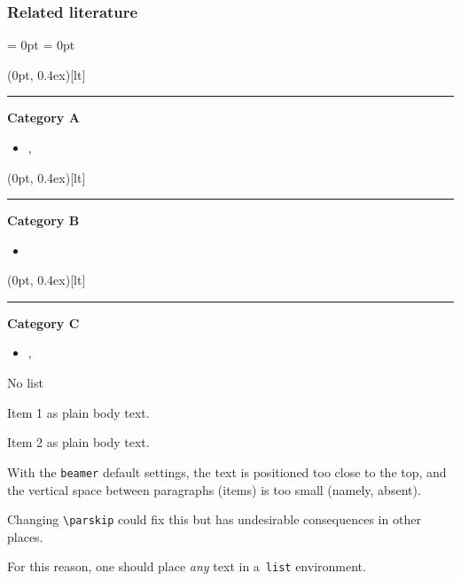 \documentclass[aspectratio = 169, t, 10pt]{beamer}
\let \cite \textcite
\begin{document}
\begin{frame}

\frametitle{%
	\tcbox[
		bottom = 1pt, left = 1pt, right = 1pt, top = 0.5pt,
		boxrule = 0pt, colback = ErasmusZincYellow, colframe = white, coltext = structure,
		on line, sharp corners
	]{\scriptsize\insertsection} \\[\smallskipamount]
	Related literature%
}

\begin{list}{}{\leftmargin = 0pt \itemindent = 0pt}
	\item<+->
		\makebox(0pt, 0.4ex)[lt]{%
			\color{ErasmusZincYellow!50}\rule{}{1.1ex}%
		}%
		\textbf{Category A}
	\par
		\begin{itemize}
			\item \cite{aristotle:anima}, \cite{aristotle:physics}
		\end{itemize}
	\item<+->
		\makebox(0pt, 0.4ex)[lt]{%
			\color{ErasmusZincYellow!50}\rule{}{1.1ex}%
		}%
		\textbf{Category B} \par
		\begin{itemize}
			\item \Cite{vangennep}
		\end{itemize}
	\item<+->
		\makebox(0pt, 0.4ex)[lt]{%
			\color{ErasmusZincYellow!50}\rule{}{1.1ex}%
		}%
		\textbf{Category C} \par
		\begin{itemize}
			\item \cite{gerhardt}, \cite{chiu}
		\end{itemize}
\end{list}

\end{frame}


\begin{frame}{No list}

Item 1 as plain body text.

Item 2 as plain body text.

\alert{With the \texttt{beamer} default settings, the text is positioned too close to the top, and the vertical space between paragraphs (items) is too small (namely, absent).}

Changing \texttt{\textbackslash parskip} could fix this but has undesirable consequences in other places.

For this reason, one should place \emph{any} text in a~\texttt{list} environment.

\end{frame}
\end{document}

